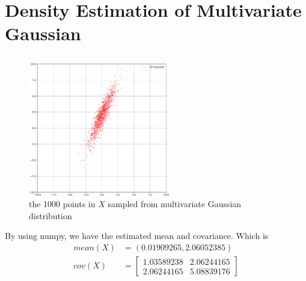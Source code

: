 \documentclass{article}
\begin{document}
\section{Density Estimation of Multivariate Gaussian}\label{sec:Density Estimation of Multivariate Gaussian} %
\subsection{} %
        \begin{figure}[hbt!]
            \centering
            \includegraphics[width=0.55\textwidth]{./assist/figure4.1.pdf}
            \caption{the 1000 points in $X$ sampled from multivariate Gaussian distribution}
        \end{figure}
By using numpy, we have the estimated mean and covariance. Which is 
\begin{align*}
    mean(X) &= (0.01909265, 2.06052385) \\
    cov(X) &= \begin{bmatrix}
    1.03589238 & 2.06244165 \\
    2.06244165 & 5.08839176
    \end{bmatrix}
\end{align*}

\end{document}
